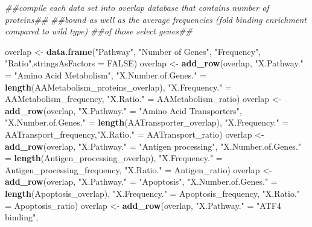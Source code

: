 \documentclass[]{article}
\newenvironment{Shaded}{\begin{snugshade}}{\end{snugshade}}
\newcommand{\CommentTok}[1]{\textcolor[rgb]{0.56,0.35,0.01}{\textit{#1}}}
\newcommand{\DataTypeTok}[1]{\textcolor[rgb]{0.13,0.29,0.53}{#1}}
\newcommand{\KeywordTok}[1]{\textcolor[rgb]{0.13,0.29,0.53}{\textbf{#1}}}
\newcommand{\NormalTok}[1]{#1}
\newcommand{\OtherTok}[1]{\textcolor[rgb]{0.56,0.35,0.01}{#1}}
\newcommand{\StringTok}[1]{\textcolor[rgb]{0.31,0.60,0.02}{#1}}
\begin{document}
\begin{Shaded}
\begin{Highlighting}[]
\CommentTok{##compile each data set into overlap database that contains number of proteins##}
\CommentTok{##bound as well as the average frequencies (fold binding enrichment compared to wild type)}
\CommentTok{##of those select genes##}

\NormalTok{overlap <-}\StringTok{ }\KeywordTok{data.frame}\NormalTok{(}\StringTok{"Pathway"}\NormalTok{, }\StringTok{"Number of Genes"}\NormalTok{, }\StringTok{"Frequency"}\NormalTok{, }\StringTok{"Ratio"}\NormalTok{,}\DataTypeTok{stringsAsFactors =} \OtherTok{FALSE}\NormalTok{)}
\NormalTok{overlap <-}\StringTok{ }\KeywordTok{add_row}\NormalTok{(overlap, }\StringTok{"X.Pathway."}\NormalTok{ =}\StringTok{ "Amino Acid Metabolism"}\NormalTok{,}
                   \StringTok{"X.Number.of.Genes."}\NormalTok{ =}\StringTok{ }\KeywordTok{length}\NormalTok{(AAMetabolism_proteins_overlap),}
                   \StringTok{"X.Frequency."}\NormalTok{ =}\StringTok{ }\NormalTok{AAMetabolism_frequency, }\StringTok{"X.Ratio."}\NormalTok{ =}\StringTok{ }\NormalTok{AAMetabolism_ratio)}
\NormalTok{overlap <-}\StringTok{ }\KeywordTok{add_row}\NormalTok{(overlap, }\StringTok{"X.Pathway."}\NormalTok{ =}\StringTok{ "Amino Acid Transporters"}\NormalTok{,}
                   \StringTok{"X.Number.of.Genes."}\NormalTok{ =}\StringTok{ }\KeywordTok{length}\NormalTok{(AATransporter_overlap), }
                   \StringTok{"X.Frequency."}\NormalTok{ =}\StringTok{ }\NormalTok{AATransport_frequency,}\StringTok{"X.Ratio."}\NormalTok{ =}\StringTok{ }\NormalTok{AATransport_ratio)}
\NormalTok{overlap <-}\StringTok{ }\KeywordTok{add_row}\NormalTok{(overlap, }\StringTok{"X.Pathway."}\NormalTok{ =}\StringTok{ "Antigen processing"}\NormalTok{,}
                   \StringTok{"X.Number.of.Genes."}\NormalTok{ =}\StringTok{ }\KeywordTok{length}\NormalTok{(Antigen_processing_overlap), }
                   \StringTok{"X.Frequency."}\NormalTok{ =}\StringTok{ }\NormalTok{Antigen_processing_frequency, }\StringTok{"X.Ratio."}\NormalTok{ =}\StringTok{ }\NormalTok{Antigen_ratio)}
\NormalTok{overlap <-}\StringTok{ }\KeywordTok{add_row}\NormalTok{(overlap, }\StringTok{"X.Pathway."}\NormalTok{ =}\StringTok{ "Apoptosis"}\NormalTok{,}
                   \StringTok{"X.Number.of.Genes."}\NormalTok{ =}\StringTok{ }\KeywordTok{length}\NormalTok{(Apoptosis_overlap), }
                   \StringTok{"X.Frequency."}\NormalTok{ =}\StringTok{ }\NormalTok{Apoptosis_frequency, }\StringTok{"X.Ratio."}\NormalTok{ =}\StringTok{ }\NormalTok{Apoptosis_ratio)}
\NormalTok{overlap <-}\StringTok{ }\KeywordTok{add_row}\NormalTok{(overlap, }\StringTok{"X.Pathway."}\NormalTok{ =}\StringTok{ "ATF4 binding"}\NormalTok{,}

\end{Highlighting}
\end{Shaded}
\end{document}
